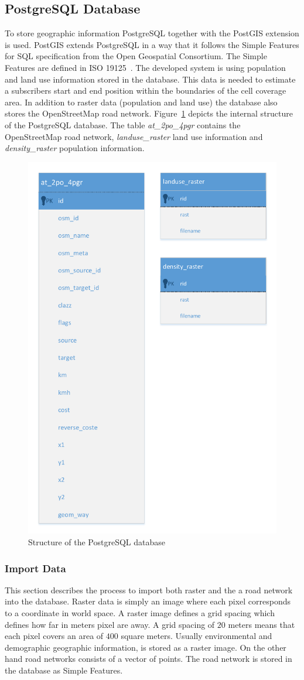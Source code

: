 \documentclass[master,english]{hgbthesis}
\begin{document}
\subsection{PostgreSQL Database}
To store geographic information PostgreSQL together with the PostGIS extension is used. PostGIS extends PostgreSQL in a way that it follows the Simple Features for SQL specification from the Open Geospatial Consortium. The Simple Features are defined in ISO 19125~\cite{ISO19125,ISO191252}. The developed system is using population and land use information stored in the database. This data is needed to estimate a subscribers start and end position within the boundaries of the cell coverage area. In addition to raster data (population and land use) the database also stores the OpenStreetMap road network. Figure~\ref{fig:pg_structure} depicts the internal structure of the PostgreSQL database. The table \emph{at_2po_4pgr} contains the OpenStreetMap road network, \emph{landuse_raster} land use information and \emph{density_raster} population information. 
\begin{figure}
\centering
\includegraphics[width=0.7\linewidth]{./images/pg_structure}
\caption{Structure of the PostgreSQL database}
\label{fig:pg_structure}
\end{figure}
\subsubsection{Import Data}
This section describes the process to import both raster and the a road network into the database. Raster data is simply an image where each pixel corresponds to a coordinate in world space. A raster image defines a grid spacing which defines how far in meters pixel are away. A grid spacing of $20$ meters means that each pixel covers an area of $400$ square meters. Usually environmental and demographic geographic information, is stored as a raster image. On the other hand road networks consists of a vector of points. The road network is stored in the database as Simple Features.
\end{document}
